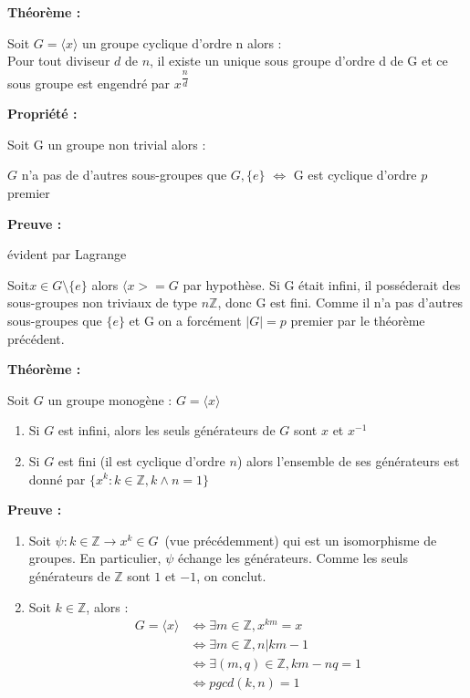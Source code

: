 \documentclass{report}
\newenvironment{preuve}{\begin{tcolorbox}[colframe= white]
    \textbf{Preuve :}
\par }
    {\end{tcolorbox}}
\newenvironment{prop}{\begin{tcolorbox}[colframe= white]
    \textbf{Propriété :}
     \par}
    {\end{tcolorbox}}
\newenvironment{theoreme}[1][]{
    \begin{tcolorbox}[]
    \textbf{Théorème :} #1  \par} 
    {\end{tcolorbox}}
\newcommand{\Z}{\mathbb{Z}}
\begin{document}
\begin{theoreme}
Soit $G = \langle x \rangle$ un groupe cyclique d'ordre n alors :\\
Pour tout diviseur $d$ de $n$, il existe un unique sous groupe d'ordre d de G et ce sous groupe est engendré par $x^{\dfrac{n}{d}}$
\end{theoreme}

\begin{prop}

Soit G un groupe non trivial alors :

\begin{center}
$G$ n'a pas de d'autres sous-groupes que $G,\{ e \}$ $\Longleftrightarrow  $ G est cyclique d'ordre $p$ premier
\end{center} 
\end{prop}

\begin{preuve}
\fbox{$\Leftarrow$} évident par Lagrange


\noindent \fbox{$\Rightarrow$} Soit$x \in G\setminus\{e\}$ alors $\langle x>=G$ par hypothèse. Si G était infini, il posséderait des sous-groupes non triviaux de type $n\Z$, donc G est fini. Comme il n'a pas d'autres sous-groupes que $\{ e\}$ et G on a forcément $|G|=p$ premier par le théorème précédent.
\end{preuve}

\begin{theoreme}
	Soit $G$ un groupe monogène : $G=\langle x \rangle$
	\begin{enumerate}
		\item Si $G$ est infini, alors les seuls générateurs de $G$ sont $x$ et $x^{-1}$ 
		\item Si $G$ est fini (il est cyclique d'ordre $n$) alors l'ensemble de ses générateurs est donné par $\{x^k : k\in \mathbb{Z}, k \wedge n =1\}$
	\end{enumerate}
\end{theoreme}

\begin{preuve}
	\begin{enumerate}
	\item	Soit $\psi : k \in \mathbb{Z} \to x^k \in G \,$ (vue précédemment) qui est un isomorphisme de groupes. En particulier, $\psi$ échange les générateurs. Comme les seuls générateurs de $\mathbb{Z}$ sont $1$ et $-1$, on conclut. 
	\item	Soit $k \in \mathbb{Z}$, alors : 
		\begin{equation*} 
		\begin{split}
			G=\langle x \rangle  &  \iff \exists m \in \mathbb{Z}, x^{km}=x \\
 			& \iff \exists m \in \mathbb{Z}, n | km-1 \\
			&  \iff \exists (m,q)\in \mathbb{Z}, km-nq=1 \\
			& \iff pgcd(k,n)=1
		\end{split}
\end{equation*}
	
	\end{enumerate}
	

\end{preuve}
\end{document}
